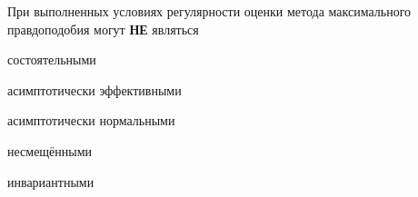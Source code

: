 
\begin{question}
При выполненных условиях регулярности оценки метода максимального правдоподобия могут \textbf{НЕ} являться
\begin{answerlist}
  \item состоятельными
  \item асимптотически эффективными
  \item асимптотически нормальными
  \item несмещёнными
  \item инвариантными
\end{answerlist}
\end{question}


